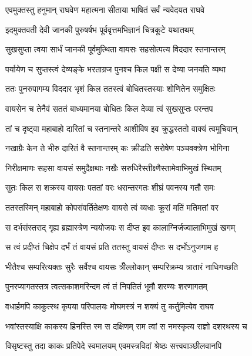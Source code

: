 
\twolineshloka
{एवमुक्तस्तु हनुमान् राघवेण महात्मना}
{सीताया भाषितं सर्वं न्यवेदयत राघवे} %

\twolineshloka
{इदमुक्तवती देवी जानकी पुरुषर्षभ}
{पूर्ववृत्तमभिज्ञानं चित्रकूटे यथातथम्} %

\twolineshloka
{सुखसुप्ता त्वया सार्धं जानकी पूर्वमुत्थिता}
{वायसः सहसोत्पत्य विददार स्तनान्तरम्} %

\twolineshloka
{पर्यायेण च सुप्तस्त्वं देव्यङ्के भरताग्रज}
{पुनश्च किल पक्षी स देव्या जनयति व्यथा} %

\twolineshloka
{ततः पुनरुपागम्य विददार भृशं किल}
{ततस्त्वं बोधितस्तस्याः शोणितेन समुक्षितः} %

\twolineshloka
{वायसेन च तेनैवं सततं बाध्यमानया}
{बोधितः किल देव्या त्वं सुखसुप्तः परन्तप} %

\twolineshloka
{तां च दृष्ट्वा महाबाहो दारितां च स्तनान्तरे}
{आशीविष इव क्रुद्धस्ततो वाक्यं त्वमूचिवान्} %

\twolineshloka
{नखाग्रैः केन ते भीरु दारितं वै स्तनान्तरम्}
{कः क्रीडति सरोषेण पञ्चवक्त्रेण भोगिना} %

\twolineshloka
{निरीक्षमाणः सहसा वायसं समुदैक्षथाः}
{नखैः सरुधिरैस्तीक्ष्णैस्तामेवाभिमुखं स्थितम्} %

\twolineshloka
{सुतः किल स शक्रस्य वायसः पततां वरः}
{धरान्तरगतः शीघ्रं पवनस्य गतौ समः} %

\twolineshloka
{ततस्तस्मिन् महाबाहो कोपसंवर्तितेक्षणः}
{वायसे त्वं व्यधाः क्रूरां मतिं मतिमतां वर} %

\twolineshloka
{स दर्भसंस्तराद् गृह्य ब्रह्मास्त्रेण न्ययोजयः}
{स दीप्त इव कालाग्निर्जज्वालाभिमुखं खगम्} %

\twolineshloka
{स त्वं प्रदीप्तं चिक्षेप दर्भं तं वायसं प्रति}
{ततस्तु वायसं दीप्तः स दर्भोऽनुजगाम ह} %

\twolineshloka
{भीतैश्च सम्परित्यक्तः सुरैः सर्वैश्च वायसः}
{त्रीँल्लोकान् सम्परिक्रम्य त्रातारं नाधिगच्छति} %

\twolineshloka
{पुनरप्यागतस्तत्र त्वत्सकाशमरिन्दम}
{त्वं तं निपतितं भूमौ शरण्यः शरणागतम्} %

\twolineshloka
{वधार्हमपि काकुत्स्थ कृपया परिपालयः}
{मोघमस्त्रं न शक्यं तु कर्तुमित्येव राघव} %

\twolineshloka
{भवांस्तस्याक्षि काकस्य हिनस्ति स्म स दक्षिणम्}
{राम त्वां स नमस्कृत्य राज्ञो दशरथस्य च} %

\twolineshloka
{विसृष्टस्तु तदा काकः प्रतिपेदे स्वमालयम्}
{एवमस्त्रविदां श्रेष्ठः सत्त्ववाञ्छीलवानपि} %

